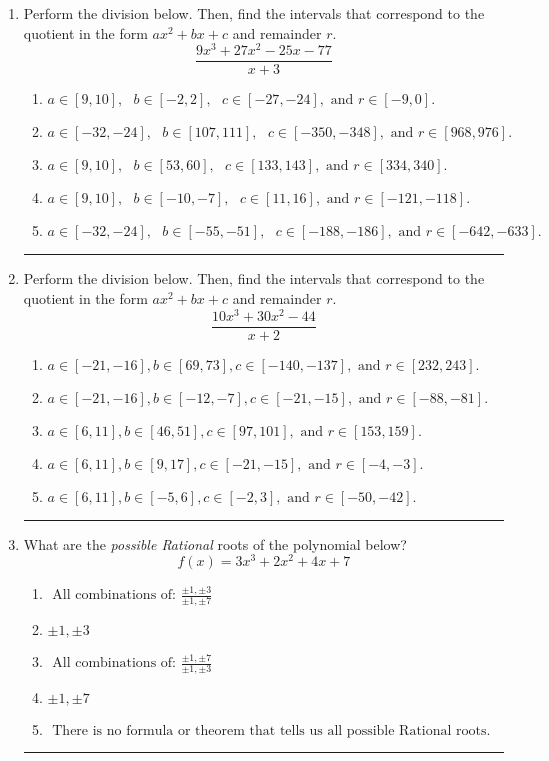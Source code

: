 \documentclass[14pt]{extbook}
\newcommand{\litem}[1]{\item#1\hspace*{-1cm}\rule{\textwidth}{0.4pt}}
\begin{document}
\begin{enumerate}
{\begin{enumerate}[label=\Alph*.]
\end{enumerate} }
\litem{
Perform the division below. Then, find the intervals that correspond to the quotient in the form $ax^2+bx+c$ and remainder $r$.\[ \frac{9x^{3} +27 x^{2} -25 x -77}{x + 3} \]\begin{enumerate}[label=\Alph*.]
\item \( a \in [9, 10], \text{   } b \in [-2, 2], \text{   } c \in [-27, -24], \text{   and   } r \in [-9, 0]. \)
\item \( a \in [-32, -24], \text{   } b \in [107, 111], \text{   } c \in [-350, -348], \text{   and   } r \in [968, 976]. \)
\item \( a \in [9, 10], \text{   } b \in [53, 60], \text{   } c \in [133, 143], \text{   and   } r \in [334, 340]. \)
\item \( a \in [9, 10], \text{   } b \in [-10, -7], \text{   } c \in [11, 16], \text{   and   } r \in [-121, -118]. \)
\item \( a \in [-32, -24], \text{   } b \in [-55, -51], \text{   } c \in [-188, -186], \text{   and   } r \in [-642, -633]. \)

\end{enumerate} }
\litem{
Perform the division below. Then, find the intervals that correspond to the quotient in the form $ax^2+bx+c$ and remainder $r$.\[ \frac{10x^{3} +30 x^{2} -44}{x + 2} \]\begin{enumerate}[label=\Alph*.]
\item \( a \in [-21, -16], b \in [69, 73], c \in [-140, -137], \text{ and } r \in [232, 243]. \)
\item \( a \in [-21, -16], b \in [-12, -7], c \in [-21, -15], \text{ and } r \in [-88, -81]. \)
\item \( a \in [6, 11], b \in [46, 51], c \in [97, 101], \text{ and } r \in [153, 159]. \)
\item \( a \in [6, 11], b \in [9, 17], c \in [-21, -15], \text{ and } r \in [-4, -3]. \)
\item \( a \in [6, 11], b \in [-5, 6], c \in [-2, 3], \text{ and } r \in [-50, -42]. \)

\end{enumerate} }
\litem{
What are the \textit{possible Rational} roots of the polynomial below?\[ f(x) = 3x^{3} +2 x^{2} +4 x + 7 \]\begin{enumerate}[label=\Alph*.]
\item \( \text{ All combinations of: }\frac{\pm 1,\pm 3}{\pm 1,\pm 7} \)
\item \( \pm 1,\pm 3 \)
\item \( \text{ All combinations of: }\frac{\pm 1,\pm 7}{\pm 1,\pm 3} \)
\item \( \pm 1,\pm 7 \)
\item \( \text{ There is no formula or theorem that tells us all possible Rational roots.} \)


\end{enumerate}}
\end{enumerate}
\end{document}
